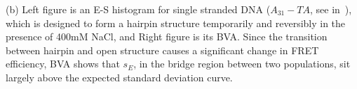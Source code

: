 (b) Left figure is an E-S histogram for single stranded DNA ($A_{31}-TA$, see in~\cite{Tsukanov_2013}), which is designed to form a hairpin structure temporarily and reversibly in the presence of 400mM NaCl, and Right figure is its BVA. Since the transition between hairpin and open structure causes a significant change in FRET efficiency, BVA shows that $s_E$, in the bridge region between two populations, sit largely above the expected standard deviation curve.